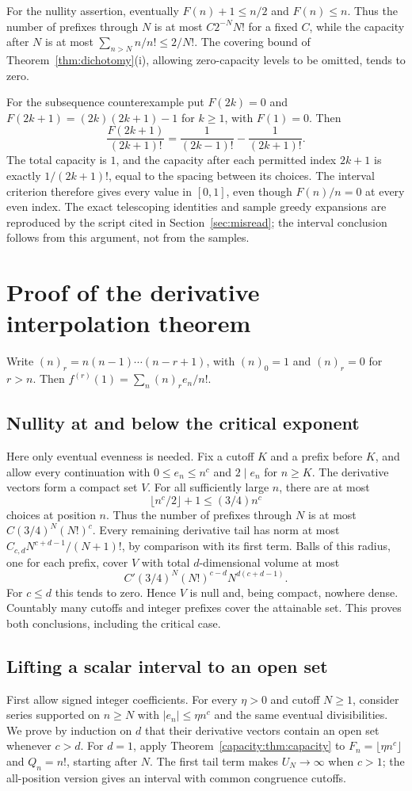 \documentclass[11pt]{article}
\begin{document}
For the nullity assertion, eventually $F(n)+1\le n/2$ and $F(n)\le n$.
Thus the number of prefixes through $N$ is at most $C2^{-N}N!$ for a fixed
$C$, while the capacity after $N$ is at most
$\sum_{n>N}n/n!\le2/N!$.  The covering bound of Theorem~\ref{thm:dichotomy}(i), allowing
zero-capacity levels to be omitted, tends to zero.

For the subsequence counterexample put $F(2k)=0$ and
$F(2k+1)=(2k)(2k+1)-1$ for $k\ge1$, with $F(1)=0$.  Then
\[
 \frac{F(2k+1)}{(2k+1)!}
 =\frac1{(2k-1)!}-\frac1{(2k+1)!}.
\]
The total capacity is $1$, and the capacity after each permitted index
$2k+1$ is exactly $1/(2k+1)!$, equal to the spacing between its choices.
The interval criterion therefore gives every value in $[0,1]$, even though
$F(n)/n=0$ at every even index.  The exact telescoping identities and sample
greedy expansions are reproduced by the script cited in
Section~\ref{sec:misread}; the interval conclusion follows from this argument,
not from the samples.


\section{Proof of the derivative interpolation theorem}\label{capacity:sec:jets-proof}
Write $(n)_r=n(n-1)\cdots(n-r+1)$, with $(n)_0=1$ and $(n)_r=0$ for
$r>n$. Then $f^{(r)}(1)=\sum_n(n)_r e_n/n!$.

\subsection{Nullity at and below the critical exponent}
Here only eventual evenness is needed. Fix a cutoff $K$ and a prefix before
$K$, and allow every continuation with $0\le e_n\le n^c$ and $2\mid e_n$
for $n\ge K$. The derivative vectors form a compact set $V$.
For all sufficiently large $n$, there are at most
\[
 \lfloor n^c/2\rfloor+1\le(3/4)n^c
\]
choices at position $n$. Thus the number of prefixes through $N$ is at most
$C(3/4)^N(N!)^c$. Every remaining derivative tail has norm at most
$C_{c,d}N^{c+d-1}/(N+1)!$, by comparison with its first term. Balls of this
radius, one for each prefix, cover $V$ with total $d$-dimensional volume
at most
\[
 C'(3/4)^N(N!)^{c-d}N^{d(c+d-1)}.
\]
For $c\le d$ this tends to zero. Hence $V$ is null and, being compact,
nowhere dense. Countably many cutoffs and integer prefixes cover the
attainable set. This proves both conclusions, including the critical case.

\subsection{Lifting a scalar interval to an open set}
First allow signed integer coefficients. For every $\eta>0$ and cutoff
$N\ge1$, consider series supported on $n\ge N$ with $|e_n|\le\eta n^c$
and the same eventual divisibilities. We prove by induction on $d$ that
their derivative vectors contain an open set whenever $c>d$.
For $d=1$, apply Theorem~\ref{capacity:thm:capacity} to
$F_n=\lfloor\eta n^c\rfloor$ and $Q_n=n!$, starting after $N$.
The first tail term makes $U_N\to\infty$ when $c>1$; the all-position
version gives an interval with common congruence cutoffs.
\end{document}
